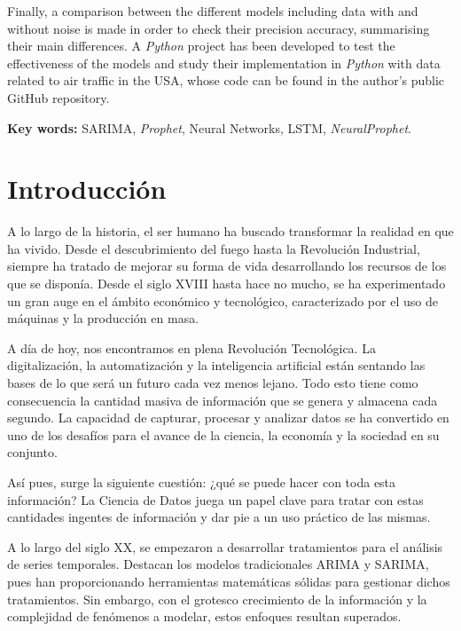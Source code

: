 \documentclass[12pt,twoside]{article}
\begin{document}
Finally, a comparison between the different models including data with and without noise is made in order to check their precision accuracy, summarising their main differences. A \textit{Python} project has been developed to test the effectiveness of the models and study their implementation in \textit{Python} with data related to air traffic in the USA, whose code can be found in the author’s public GitHub repository.

\textbf{Key words:} SARIMA, \textit{Prophet}, Neural Networks, LSTM, \textit{NeuralProphet}.


\newpage

\tableofcontents

\newpage

\section{Introducción}\label{sec:1}

A lo largo de la historia, el ser humano ha buscado transformar la realidad en que ha vivido. Desde el descubrimiento del fuego hasta la Revolución Industrial, siempre ha tratado de mejorar su forma de vida desarrollando los recursos de los que se disponía. Desde el siglo XVIII hasta hace no mucho, se ha experimentado un gran auge en el ámbito económico y tecnológico, caracterizado por el uso de máquinas y la producción en masa. 

A día de hoy, nos encontramos en plena Revolución Tecnológica. La digitalización, la automatización y la inteligencia artificial están sentando las bases de lo que será un futuro cada vez menos lejano. Todo esto tiene como consecuencia la cantidad masiva de información que se genera y almacena cada segundo. La capacidad de capturar, procesar y analizar datos se ha convertido en uno de los desafíos para el avance de la ciencia, la economía y la sociedad en su conjunto.

Así pues, surge la siguiente cuestión: ¿qué se puede hacer con toda esta información? La Ciencia de Datos juega un papel clave para tratar con estas cantidades ingentes de información y dar pie a un uso práctico de las mismas.

A lo largo del siglo XX, se empezaron a  desarrollar tratamientos para el análisis de series temporales. Destacan los modelos tradicionales ARIMA y SARIMA, pues han proporcionando herramientas matemáticas sólidas para gestionar dichos tratamientos. Sin embargo, con el grotesco crecimiento de la información y la complejidad de fenómenos a modelar, estos enfoques resultan superados.
\end{document}
